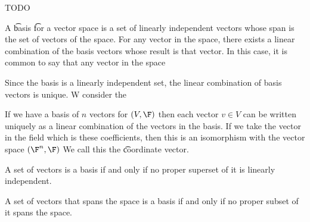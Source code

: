 

TODO


A \t{basis} \t{for} a vector space is a set of linearly independent vectors whose span is the set of vectors of the space.
For any vector in the space, there exists a linear combination of the basis vectors whose result is that vector.
In this case, it is common to say that any vector in the space 

Since the basis is a linearly independent set, the linear combination of basis vectors is unique.
W consider the

If we have a basis of $n$ vectors for $(V, \F)$ then each vector $v \in V$ can be written uniquely as a linear combination of the vectors in the basis.
If we take the vector in the field which is these coefficients, then this is an isomorphism with the vector space $(\F^n, \F)$
We call this the \t{coordinate vector}.


\begin{prop}
  A set of vectors is a basis if and only if no proper superset of it is linearly independent.
\end{prop}

\begin{prop}
  A set of vectors that spans the space is a basis if and only if no proper subset of it spans the space.
\end{prop}

